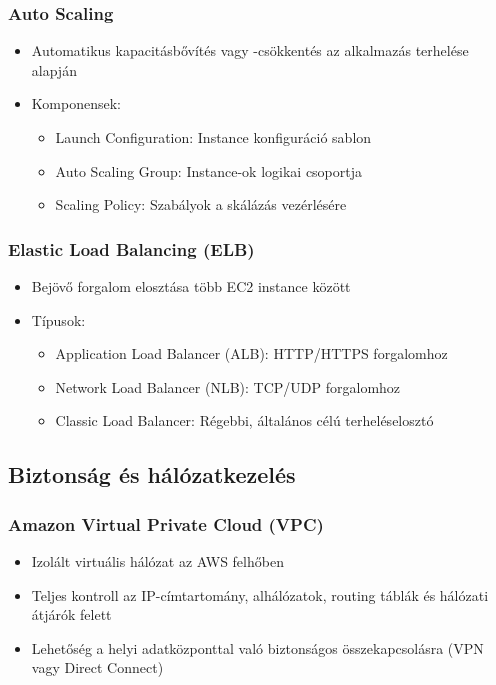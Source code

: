 \documentclass[a4paper,12pt]{article}
\begin{document}
    \subsubsection{Auto Scaling}

    \begin{itemize}
        \item Automatikus kapacitásbővítés vagy -csökkentés az alkalmazás terhelése alapján
        \item Komponensek:
        \begin{itemize}
            \item Launch Configuration: Instance konfiguráció sablon
            \item Auto Scaling Group: Instance-ok logikai csoportja
            \item Scaling Policy: Szabályok a skálázás vezérlésére
        \end{itemize}
    \end{itemize}

    \subsubsection{Elastic Load Balancing (ELB)}

    \begin{itemize}
        \item Bejövő forgalom elosztása több EC2 instance között
        \item Típusok:
        \begin{itemize}
            \item Application Load Balancer (ALB): HTTP/HTTPS forgalomhoz
            \item Network Load Balancer (NLB): TCP/UDP forgalomhoz
            \item Classic Load Balancer: Régebbi, általános célú terheléselosztó
        \end{itemize}
    \end{itemize}

    \subsection{Biztonság és hálózatkezelés}

    \subsubsection{Amazon Virtual Private Cloud (VPC)}

    \begin{itemize}
        \item Izolált virtuális hálózat az AWS felhőben
        \item Teljes kontroll az IP-címtartomány, alhálózatok, routing táblák és hálózati átjárók felett
        \item Lehetőség a helyi adatközponttal való biztonságos összekapcsolásra (VPN vagy Direct Connect)
    \end{itemize}
\end{document}
